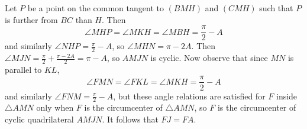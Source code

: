Let $P$ be a point on the common tangent to $\left(BMH\right)$ and $\left(CMH\right)$ such that $P$ is further from $BC$ than $H$. Then \[\angle{MHP}=\angle{MKH}=\angle{MBH}=\frac{\pi}{2}-A\] and similarly $\angle{NHP}=\frac{\pi}{2}-A$, so $\angle{MHN}=\pi-2A$. Then $\angle{MJN}=\frac{\pi}{2}+\frac{\pi-2A}{2}=\pi-A$, so $AMJN$ is cyclic. Now observe that since $MN$ is parallel to $KL$, \[\angle{FMN}=\angle{FKL}=\angle{MKH}=\frac{\pi}{2}-A\] and similarly $\angle{FNM}=\frac{\pi}{2}-A$, but these angle relations are satisfied for $F$ inside $\triangle{AMN}$ only when $F$ is the circumcenter of $\triangle{AMN}$, so $F$ is the circumcenter of cyclic quadrilateral $AMJN$. It follows that $FJ=FA$.